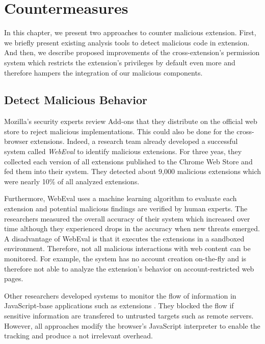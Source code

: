 
\chapter{Countermeasures}
\label{chp:countermeasures}

	In this chapter, we present two approaches to counter malicious extension. First, we briefly present existing analysis tools to detect malicious code in extension. And then, we describe proposed improvements of the cross-extension's permission system which restricts the extension's privileges by default even more and therefore hampers the integration of our malicious components.

\section{Detect Malicious Behavior}
\label{sec:detectMaliciousBehavior}
	 
	Mozilla's security experts review Add-ons that they distribute on the official web store to reject malicious implementations. This could also be done for the cross-browser extensions. Indeed, a research team already developed a successful system called \textit{WebEval} to identify malicious extensions. For three yeas, they collected each version of all extensions published to the Chrome Web Store and fed them into their system. They detected about 9,000 malicious extensions which were nearly 10\% of all analyzed extensions.
	
	Furthermore, WebEval uses a machine learning algorithm to evaluate each extension and potential malicious findings are verified by human experts. The researchers measured the overall accuracy of their system which increased over time although they experienced drops in the accuracy when new threats emerged. \\
	A disadvantage of WebEval is that it executes the extensions in a sandboxed environment. Therefore, not all malicious interactions with web content can be monitored. For example, the system has no account creation on-the-fly and is therefore not able to analyze the extension's behavior on account-restricted web pages.
	
	Other researchers developed systems to monitor the flow of information in JavaScript-base applications such as extensions \cite{Dhawan:2009:AIF:1723192.1723250, Hallaraker:2005:DMJ:1078029.1078861, cs2015sentinel,ndss2007xss}. They blocked the flow if sensitive information are transfered to untrusted targets such as remote servers. However, all approaches modify the browser's JavaScript interpreter to enable the tracking and produce a not irrelevant overhead.
	

